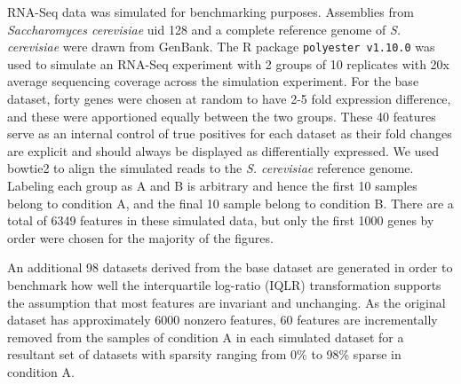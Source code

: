 \documentclass[10pt]{article}
\begin{document}
RNA-Seq data was simulated for benchmarking purposes. Assemblies from \textit{Saccharomyces cerevisiae} uid 128 and  a complete reference genome of \textit{S. cerevisiae} were drawn from GenBank. The R package \texttt{polyester v1.10.0}  was used to simulate an RNA-Seq experiment with 2 groups of 10 replicates with 20x average sequencing coverage across the simulation experiment. For the base dataset, forty genes were chosen at random to have 2-5 fold expression difference, and these were apportioned equally between the two groups. These 40 features serve as an internal control of true positives for each dataset as their fold changes are explicit and should always be displayed as differentially expressed. We used bowtie2  to align the simulated reads  to the \textit{S. cerevisiae} reference genome. Labeling each group as A and B is arbitrary and hence the first 10 samples belong to condition A, and the final 10 sample belong to condition B. There are a total of 6349 features in these simulated data, but only the first 1000 genes by order were chosen for the majority of the figures. 

An additional 98 datasets derived from the base dataset are generated in order to benchmark how well the interquartile log-ratio (IQLR) transformation supports the assumption that most features are invariant and unchanging. As the original dataset has approximately 6000 nonzero features, 60 features are incrementally removed from the samples of condition A in each simulated dataset for a resultant set of datasets with sparsity ranging from 0\% to 98\% sparse in condition A. 
\end{document}
